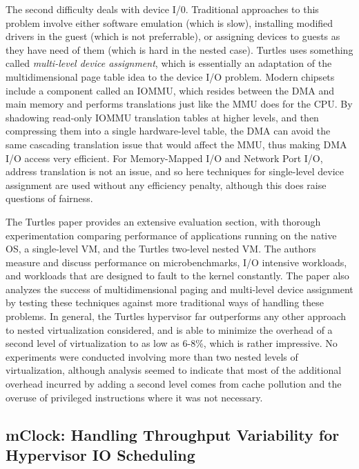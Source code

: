 \documentclass[letterpaper, twocolumn]{article}
\begin{document}
The second difficulty deals with device I/0.  Traditional approaches to this problem
involve either software emulation (which is slow), installing modified drivers in the
guest (which is not preferrable), or assigning devices to guests as they have need
of them (which is hard in the nested case).  Turtles uses something called
\emph{multi-level device assignment}, which is essentially an adaptation of the
multidimensional page table idea to the device I/O problem.  Modern chipsets
include a component called an IOMMU, which resides between the DMA and main memory
and performs translations just like the MMU does for the CPU.  By shadowing read-only
IOMMU translation tables at higher levels, and then compressing them into a single
hardware-level table, the DMA can avoid the same cascading translation issue that
would affect the MMU, thus making DMA I/O access very efficient.  For Memory-Mapped I/O
and Network Port I/O, address translation is not an issue, and so here techniques for
single-level device assignment are used without any efficiency penalty, although
this does raise questions of fairness.

The Turtles paper provides an extensive evaluation section, with thorough experimentation
comparing performance of applications running on the native OS, a single-level VM, and the
Turtles two-level nested VM.  The authors measure and discuss performance on microbenchmarks,
I/O intensive workloads, and workloads that are designed to fault to the kernel constantly.
The paper also analyzes the success of multidimensional paging and multi-level device
assignment by testing these techniques against more traditional ways of handling these
problems.  In general, the Turtles hypervisor far outperforms any other approach to
nested virtualization considered, and is able to minimize the overhead of a second
level of virtualization to as low as 6-8\%, which is rather impressive.  No experiments
were conducted involving more than two nested levels of virtualization, although analysis
seemed to indicate that most of the additional overhead incurred by adding a second level
comes from cache pollution and the overuse of privileged instructions where it was not
necessary.

\subsection{mClock: Handling Throughput Variability for Hypervisor IO Scheduling}
\label{sec:summaries/mclock}
\end{document}
